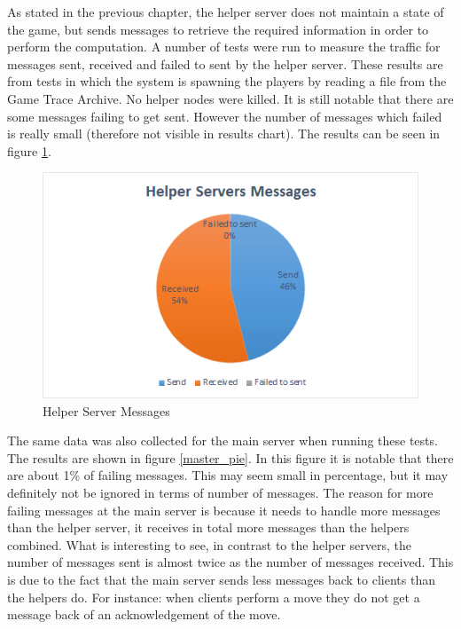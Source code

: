 As stated in the previous chapter, the helper server does not maintain a state of the game, but sends messages to retrieve the required information in order to perform the computation. 
A number of tests were run to measure the traffic for messages sent, received and failed to sent by the helper server.
These results are from tests in which the system is spawning the players by reading a file from the Game Trace Archive.
No helper nodes were killed.
It is still notable that there are some messages failing to get sent. 
However the number of messages which failed is really small (therefore not visible in results chart).
The results can be seen in figure \ref{helper_pie}.


\begin{figure}[!ht]
\centering
\includegraphics[scale=0.8]{images/helper_pie.png}
\caption{Helper Server Messages}
\label{helper_pie}
\end{figure}

The same data was also collected for the main server when running these tests.
The results are shown in figure \ref{master_pie}.
In this figure it is notable that there are about 1\% of failing messages.
This may seem small in percentage, but it may definitely not be ignored in terms of number of messages.
The reason for more failing messages at the main server is because it needs to handle more messages than the helper server, it receives in total more messages than the helpers combined.
What is interesting to see, in contrast to the helper servers, the number of messages sent is almost twice as the number of messages received.
This is due to the fact that the main server sends less messages back to clients than the helpers do.
For instance: when clients perform a move they do not get a message back of an acknowledgement of the move.

